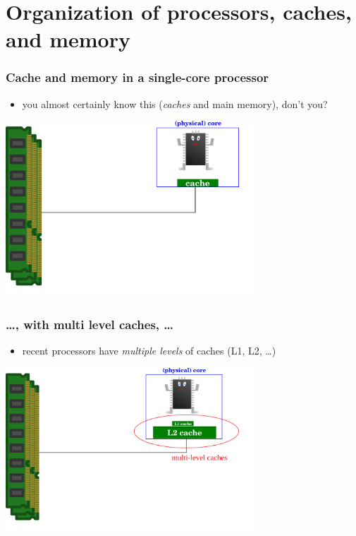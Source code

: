 \documentclass[12pt,dvipdfmx]{beamer}
\newcommand{\ao}[1]{{\color{blue}#1}}
\begin{document}
\section{Organization of processors, caches, and memory}

\begin{frame}
\frametitle{Cache and memory in a single-core processor}
\begin{itemize}
\item [] you almost certainly know this (\ao{\em caches} and main memory), 
  don't you? 
  
\end{itemize}
\begin{center}
\includegraphics[width=0.7\textwidth]{out/pdf/svg/diagram_single_level_cache.pdf}
\end{center}
\end{frame}

\begin{frame}
\frametitle{\ldots , with multi level caches, \ldots}
\begin{itemize}
\item [] recent processors have \ao{\em multiple levels} of caches (L1, L2, \ldots)
\end{itemize}
\begin{center}
\includegraphics[width=0.7\textwidth]{out/pdf/svg/diagram_multi_level_cache.pdf}
\end{center}
\end{frame}
\end{document}
